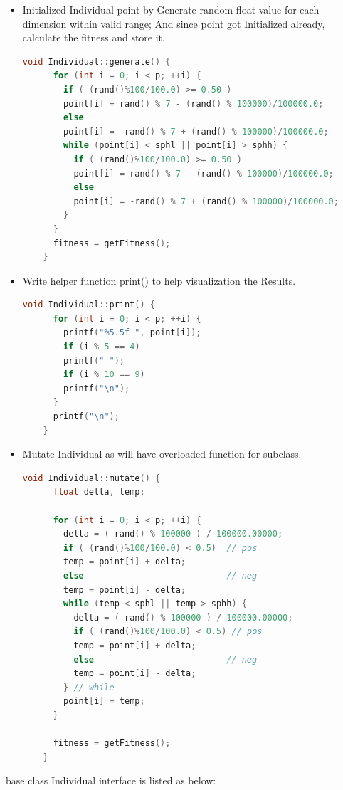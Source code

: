 \documentclass{article}
\begin{document}
\begin{CJK}{UTF8}{gbsn}
\begin{itemize}
\item Initialized Individual point by Generate random float value for each dimension within valid range; And since point got Initialized already, calculate the fitness and store it.
\begin{lstlisting}[language=c++]
    void Individual::generate() {
      for (int i = 0; i < p; ++i) {
        if ( (rand()%100/100.0) >= 0.50 )
        point[i] = rand() % 7 - (rand() % 100000)/100000.0;
        else
        point[i] = -rand() % 7 + (rand() % 100000)/100000.0;
        while (point[i] < sphl || point[i] > sphh) {
          if ( (rand()%100/100.0) >= 0.50 )
          point[i] = rand() % 7 - (rand() % 100000)/100000.0;
          else
          point[i] = -rand() % 7 + (rand() % 100000)/100000.0;
        } 
      }     
      fitness = getFitness();
    }
\end{lstlisting}

\item Write helper function print() to help visualization the Results.
  \begin{lstlisting}[language=c++]
    void Individual::print() {
      for (int i = 0; i < p; ++i) {
        printf("%5.5f ", point[i]);
        if (i % 5 == 4)
        printf(" ");
        if (i % 10 == 9)
        printf("\n");
      }
      printf("\n");
    }
  \end{lstlisting}

\item Mutate Individual as will have overloaded function for subclass.
  \begin{lstlisting}[language=c++]
    void Individual::mutate() {
      float delta, temp;

      for (int i = 0; i < p; ++i) {
        delta = ( rand() % 100000 ) / 100000.00000;
        if ( (rand()%100/100.0) < 0.5)  // pos
        temp = point[i] + delta;
        else                            // neg
        temp = point[i] - delta;
        while (temp < sphl || temp > sphh) {
          delta = ( rand() % 100000 ) / 100000.00000;
          if ( (rand()%100/100.0) < 0.5) // pos
          temp = point[i] + delta;
          else                          // neg
          temp = point[i] - delta;
        } // while
        point[i] = temp;
      }
      
      fitness = getFitness();
    }
  \end{lstlisting}
\end{itemize}
base class Individual interface is listed as below: 



\end{CJK}
\end{document}
